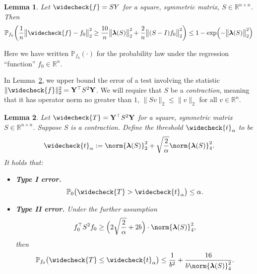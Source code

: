 \documentclass[twoside]{article}
\newcommand{\Reals}{\mathbb{R}}
\newcommand{\1}{\mathbf{1}}
\newcommand{\lambdavec}{\boldsymbol{\lambda}}
\newcommand{\Pbb}{\mathbb{P}}
\newcommand{\wc}[1]{\widecheck{#1}}
\newtheorem{lemma}{Lemma}
\theoremstyle{definition}
\theoremstyle{remark}
\begin{document}
\begin{lemma}
	\label{lem:linear_smoother_fixed_graph_estimation}
	Let $\wc{f} = SY$ for a square, symmetric matrix, $S \in \Reals^{n \times n}$. Then
	\begin{equation*}
	\Pbb_{f_0}\biggl(\frac{1}{n}\bigl\|\wc{f} - f_0\bigr\|_2^2 \geq \frac{10}{n} \bigl\|\lambdavec(S)\bigr\|_2^2 + \frac{2}{n}\bigl\|(S - I)f_0\bigr\|_2^2\biggr) \leq 1 - \exp\Bigl(-\bigl\|\lambdavec(S)\bigr\|_2^2\Bigr)
	\end{equation*}
\end{lemma}
Here we have written $\Pbb_{f_0}(\cdot)$ for the probability law under the regression ``function'' $f_0 \in \Reals^n$. 

In Lemma~\ref{lem:linear_smoother_fixed_graph_testing}, we upper bound the error of a test involving the statistic $\|\wc{f}\|_2^2 = {\bf Y}^{\top} S^2 {\bf Y}$. We will require that $S$ be a \emph{contraction}, meaning that it has operator norm no greater than $1$, $\|Sv\|_2 \leq \|v\|_2$ for all $v \in \Reals^n$.
\begin{lemma}
	\label{lem:linear_smoother_fixed_graph_testing}
	Let $\wc{T} = {\bf Y}^{\top} S^2 {\bf Y}$ for a square, symmetric matrix $S \in \Reals^{n \times n}$. Suppose $S$ is a contraction. Define the threshold $\wc{t}_{\alpha}$ to be 
	\begin{equation}
	\label{eqn:linear_smoother_fixed_graph_threshold}
	\wc{t}_{\alpha} := \norm{\lambdavec(S)}_2^2 + \sqrt{\frac{2}{\alpha}} \norm{\lambdavec(S)}_4^2.
	\end{equation}
	It holds that:
	\begin{itemize}
		\item \textbf{Type I error.}
		\begin{equation}
		\label{eqn:linear_smoother_fixed_graph_testing_typeI}
		\Pbb_0\bigl(\wc{T} > \wc{t}_{\alpha}\bigr) \leq \alpha.
		\end{equation}
		\item \textbf{Type II error.} Under the further assumption
		\begin{equation}
		\label{eqn:linear_smoother_fixed_graph_testing_critical_radius}
		f_0^{\top} S^2 f_0 \geq \Bigl(2\sqrt{\frac{2}{\alpha}} + 2b\Bigr) \cdot \norm{\lambdavec(S)}_4^2,
		\end{equation}
		then
		\begin{equation}
		\label{eqn:linear_smoother_fixed_graph_testing_typeII}
		\Pbb_{f_0}\bigl(\wc{T} \leq \wc{t}_{\alpha}\bigr) \leq \frac{1}{b^2} + \frac{16}{b \norm{\lambdavec(S)}_4^{2}}.
		\end{equation}
	\end{itemize}
\end{lemma}
\end{document}
